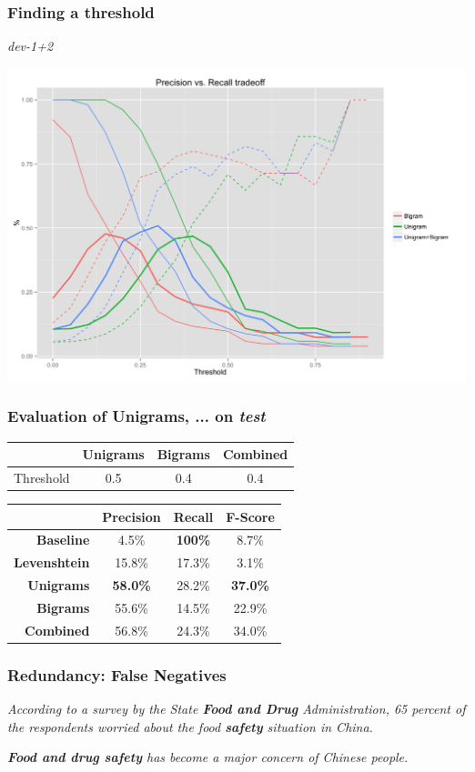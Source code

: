 \documentclass[table]{beamer}
\begin{document}
\begin{frame}
  \frametitle{Finding a threshold}
  \center\textit{dev-1+2}

  \quad\includegraphics[scale=0.09]{a.png}
\end{frame}

\begin{frame}
  \frametitle{Evaluation of \textbf{Unigrams}, ... on \textit{test}}
  \begin{tabular}{r|c|c|c|}
    & \textbf{Unigrams} & \textbf{Bigrams} & \textbf{Combined}\\
  \hline
  Threshold & 0.5 & 0.4 & 0.4
  \end{tabular}
  \vspace{1cm}

  \begin{tabular}{r|c|c|c|}
  & Precision & Recall & F-Score \\
  \hline
  \textbf{Baseline} & 4.5\% & \textbf{100\%} & 8.7\% \\
  \hline
  \textbf{Levenshtein} & 15.8\% & 17.3\% & 3.1\% \\
  \hline
  \textbf{Unigrams} & \textbf{58.0\%} & 28.2\% & \textbf{37.0\%} \\
  \hline
  \textbf{Bigrams} & 55.6\% & 14.5\% & 22.9\% \\
  \hline
  \textbf{Combined} & 56.8\% & 24.3\% & 34.0\% \\
  \hline
  \end{tabular}
  \vspace{0.5cm}
\end{frame}

\begin{frame}
  \frametitle{Redundancy: False Negatives}
  \textit{According to a survey by the State \textbf{Food and Drug} Administration, 65 percent of the respondents worried about the food \textbf{safety} situation in China.}
  \vspace{0.1cm}

  \textit{\textbf{Food and drug safety} has become a major concern of Chinese people.}
\end{frame}
\end{document}
